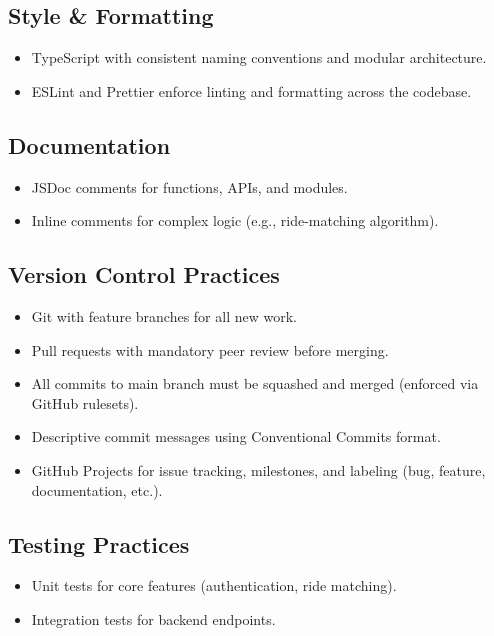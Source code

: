 \documentclass{article}
\begin{document}
\subsection*{Style \& Formatting}
\begin{itemize}
    \item TypeScript with consistent naming conventions and modular architecture.
    \item ESLint and Prettier enforce linting and formatting across the codebase.
\end{itemize}

\subsection*{Documentation}
\begin{itemize}
    \item JSDoc comments for functions, APIs, and modules.
    \item Inline comments for complex logic (e.g., ride-matching algorithm).
\end{itemize}

\subsection*{Version Control Practices}
\begin{itemize}
    \item Git with feature branches for all new work.
    \item Pull requests with mandatory peer review before merging.
    \item All commits to main branch must be squashed and merged (enforced via GitHub rulesets).
    \item Descriptive commit messages using Conventional Commits format.
    \item GitHub Projects for issue tracking, milestones, and labeling (bug, feature, documentation, etc.).
\end{itemize}

\subsection*{Testing Practices}
\begin{itemize}
    \item Unit tests for core features (authentication, ride matching).
    \item Integration tests for backend endpoints.
\end{itemize}
\end{document}
